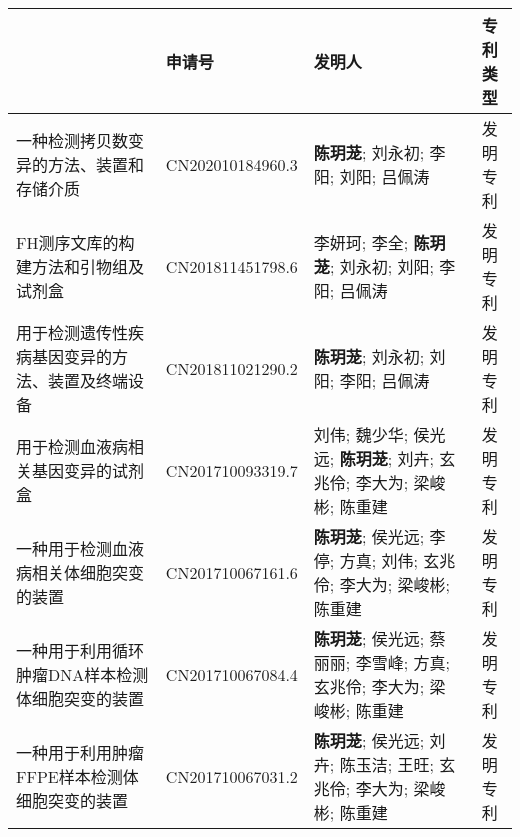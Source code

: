 



\begin{table}[h]

\centering
\tablefont
\begin{tabularx}{\textwidth}{>{\raggedright\arraybackslash}X| X| X| c}
\toprule
{\textbf{专利名称}} & {\textbf{申请号}} & {\textbf{发明人}} & {\textbf{专利类型}} \\
\midrule

一种检测拷贝数变异的方法、装置和存储介质 & CN202010184960.3 & \textbf{陈玥茏}; 刘永初; 李阳; 刘阳; 吕佩涛 & 发明专利 \\
\addlinespace

FH测序文库的构建方法和引物组及试剂盒 & CN201811451798.6 & 李妍珂; 李全; \textbf{陈玥茏}; 刘永初; 刘阳; 李阳; 吕佩涛 &发明专利 \\
\addlinespace

用于检测遗传性疾病基因变异的方法、装置及终端设备 & CN201811021290.2 & \textbf{陈玥茏}; 刘永初; 刘阳; 李阳; 吕佩涛 & 发明专利\\
\addlinespace

用于检测血液病相关基因变异的试剂盒 & CN201710093319.7 & 刘伟; 魏少华; 侯光远; \textbf{陈玥茏}; 刘卉; 玄兆伶; 李大为; 梁峻彬; 陈重建 & 发明专利\\
\addlinespace

一种用于检测血液病相关体细胞突变的装置 & CN201710067161.6 & \textbf{陈玥茏}; 侯光远; 李停; 方真; 刘伟; 玄兆伶; 李大为; 梁峻彬; 陈重建 & 发明专利\\
\addlinespace

一种用于利用循环肿瘤DNA样本检测体细胞突变的装置 & CN201710067084.4 & \textbf{陈玥茏}; 侯光远; 蔡丽丽; 李雪峰; 方真; 玄兆伶; 李大为; 梁峻彬; 陈重建 &发明专利 \\
\addlinespace

一种用于利用肿瘤FFPE样本检测体细胞突变的装置 & CN201710067031.2 & \textbf{陈玥茏}; 侯光远; 刘卉; 陈玉洁; 王旺; 玄兆伶; 李大为; 梁峻彬; 陈重建 &发明专利 \\
\bottomrule
\end{tabularx}
\end{table}

